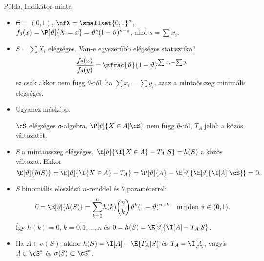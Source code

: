 \documentclass[aspectratio=169,notheorems,9pt,\option]{beamer}
\begin{document}
\begin{frame}{Példa, Indikátor minta}
  \begin{itemize}
    \item $\Theta=(0,1)$, $\mfX=\smallset{0,1}^n$, 
      $f_\theta(x)=\P[\theta]{X=x}=\theta^{s}(1-\theta)^{n-s}$, ahol $s=\sum x_i$.
    \item $S=\sum X_i$ elégséges. Van-e egyszerűbb elégséges statisztika?
    \pause
    \begin{displaymath}
      \frac{f_\theta(x)}{f_\theta(y)}=\zfrac{\theta}{1-\theta}^{\sum x_i-\sum y_i}  
    \end{displaymath}
    ez csak akkor nem függ $\theta$-tól, ha $\sum x_i=\sum y_i$, azaz a mintaösszeg minimális elégséges.
    \item Ugyanez másképp. 
    
    $\cS$ elégséges $\sigma$-algebra. $\P[\theta]{X\in A|\cS}$ nem függ $\theta$-tól, 
    $T_A$ jelöli a közös változatot.
    \item $S$ a mintaösszeg elégséges, $\E[\theta]{\I{X\in A}-T_A|S}=h(S)$ a közös változat. Ekkor 
    \begin{displaymath}
      \E[\theta]{h(S)}=\E[\theta]{\I{X\in A}-T_A}
      =\P[\theta]{A}-\E[\theta]{\E[\theta]{\I[A]|\cS}}=0.
    \end{displaymath}
    \item $S$ binomiális eloszlású $n$-renddel 
    és $\theta$ paraméterrel:
    \begin{displaymath}
      0=\E[\theta]{h(S)}=
      \sum_{k=0}^n h(k)\binom n k \theta^k(1-\theta)^{n-k}\quad\text{minden $\theta\in(0,1)$}.
    \end{displaymath}
    Így $h(k)=0$, $k=0,1,\dots,n$ és $0=h(S)=\E[\theta]{\I[A]-T_A|S}$.
    \item Ha $A\in\sigma(S)$, akkor $h(S)=\I[A]-\E{T_A|S}$ és $T_A=\I[A]$, vagyis $A\in\cS^*$ és $\sigma(S)\subset\cS^*$.
  \end{itemize}
\end{frame}
\end{document}
